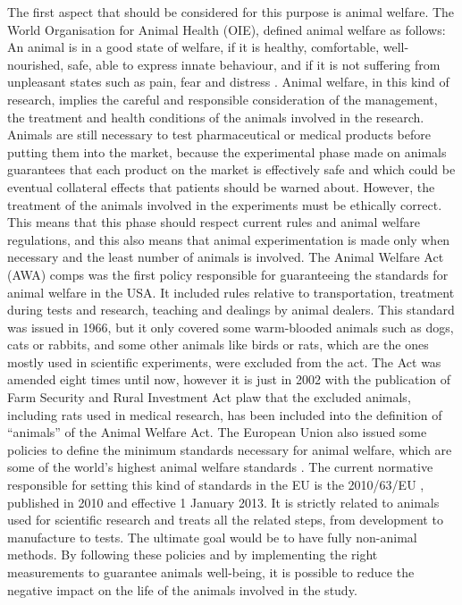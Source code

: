 \documentclass{Configuration_Files/PoliMi3i_thesis}
\begin{document}
The first aspect that should be considered for this purpose is animal welfare. The World Organisation for Animal Health (OIE), defined animal welfare as follows: An animal is in a good state of welfare, if it is healthy, comfortable, well-nourished, safe, able to express innate behaviour, and if it is not suffering from unpleasant states such as pain, fear and distress \cite{Chapter}. Animal welfare, in this kind of research, implies the careful and responsible consideration of the management, the treatment and health conditions of the animals involved in the research.
Animals are still necessary to test pharmaceutical or medical products before putting them into the market, because the experimental phase made on animals guarantees that each product on the market is effectively safe and which could be eventual collateral effects that patients should be warned about. However, the treatment of the animals involved in the experiments must be ethically correct. This means that this phase should respect current rules and animal welfare regulations, and this also means that animal experimentation is made only when necessary and the least number of animals is involved. 
The Animal Welfare Act (AWA)  \cite{AnimalWelfareEU} comps was the first policy responsible for guaranteeing the standards for animal welfare in the USA. It included rules relative to transportation, treatment during tests and research, teaching and dealings by animal dealers. This standard was issued in 1966, but it only covered some warm-blooded animals such as dogs, cats or rabbits, and some other animals like birds or rats, which are the ones mostly used in scientific experiments, were excluded from the act. The Act was amended eight times until now, however it is just in 2002 with the publication of Farm Security and Rural Investment Act \cite{CongressgovLibraryCongress} plaw that the excluded animals, including rats used in medical research, has been included into the definition of “animals” of the Animal Welfare Act.
The European Union also issued some policies to define the minimum standards necessary for animal welfare, which are some of the world’s highest animal welfare standards \cite{AnimalWelfareEU}. The current normative responsible for setting this kind of standards in the EU is the 2010/63/EU \cite{Direttiva201063}, published in 2010 and effective 1 January 2013. It is strictly related to animals used for scientific research and treats all the related steps, from development to manufacture to tests. The ultimate goal would be to have fully non-animal methods.
By following these policies and by implementing the right measurements to guarantee animals well-being, it is possible to reduce the negative impact on the life of the animals involved in the study.
\end{document}
